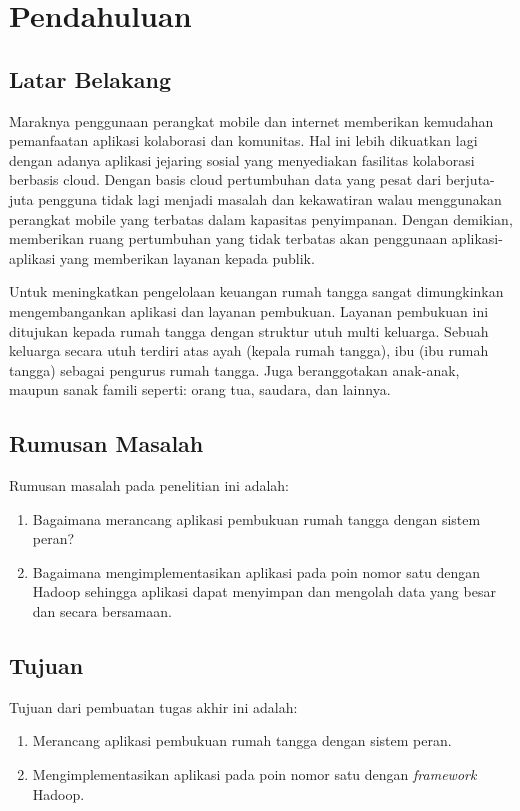 \chapter{Pendahuluan}
\label{chap:pendahuluan}

\section{Latar Belakang}
\label{sec:latarbelakang}
Maraknya penggunaan perangkat mobile dan internet memberikan kemudahan pemanfaatan aplikasi kolaborasi dan komunitas. Hal ini lebih dikuatkan lagi dengan adanya aplikasi jejaring sosial yang menyediakan fasilitas kolaborasi berbasis cloud. Dengan basis cloud pertumbuhan data yang pesat dari berjuta-juta pengguna tidak lagi menjadi masalah dan kekawatiran walau menggunakan perangkat mobile yang terbatas dalam kapasitas penyimpanan. Dengan demikian, memberikan ruang pertumbuhan yang tidak terbatas akan penggunaan aplikasi-aplikasi yang memberikan layanan kepada publik.

Untuk meningkatkan pengelolaan keuangan rumah tangga sangat dimungkinkan mengembangankan aplikasi dan layanan pembukuan. Layanan pembukuan ini ditujukan kepada rumah tangga dengan struktur utuh multi keluarga. Sebuah keluarga secara utuh terdiri atas ayah (kepala rumah tangga), ibu (ibu rumah tangga) sebagai pengurus rumah tangga. Juga beranggotakan anak-anak, maupun sanak famili seperti: orang tua, saudara, dan lainnya.

\section{Rumusan Masalah}
\label{sec:rumusanmalasah}

Rumusan masalah pada penelitian ini adalah:
\begin{enumerate}
\item Bagaimana merancang aplikasi pembukuan rumah tangga dengan sistem peran?
\item Bagaimana mengimplementasikan aplikasi pada poin nomor satu dengan  Hadoop sehingga aplikasi dapat menyimpan dan mengolah data yang besar dan secara bersamaan.
\end{enumerate}

\section{Tujuan}
\label{sec:tujuan}

Tujuan dari pembuatan tugas akhir ini adalah:
\begin{enumerate}
\item Merancang aplikasi pembukuan rumah tangga dengan sistem peran.
\item Mengimplementasikan aplikasi pada poin nomor satu dengan \textit{framework} Hadoop.
\end{enumerate}

